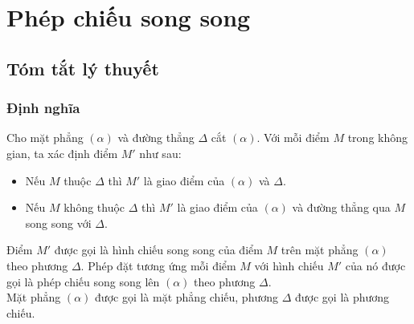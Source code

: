 \section{Phép chiếu song song}
\subsection{Tóm tắt lý thuyết}
\begin{tomtat}
\begin{center}
\end{center}
\subsubsection{Định nghĩa}
\begin{dn}
	Cho mặt phẳng $(\alpha)$ và đường thẳng $\Delta$ cắt $(\alpha)$. Với mỗi điểm $M$ trong không gian, ta xác định điểm $M'$ như sau:
\begin{itemize}
	\item Nếu $M$ thuộc $\Delta$ thì $M'$ là giao điểm của $(\alpha)$ và $\Delta$.
	\item Nếu $M$ không thuộc $\Delta$ thì $M'$ là giao điểm của $(\alpha)$ và đường thẳng qua $M$ song song với $\Delta$.
\end{itemize}
	Điểm $M'$ được gọi là hình chiếu song song của điểm $M$ trên mặt phẳng $(\alpha)$ theo phương $\Delta$. Phép đặt tương ứng mỗi điểm $M$ với hình chiếu $M'$ của nó được gọi là phép chiếu song song lên $(\alpha)$ theo phương $\Delta$.\\
	Mặt phẳng $(\alpha)$ được gọi là mặt phẳng chiếu, phương $\Delta$ được gọi là phương chiếu.
\end{dn}


\end{tomtat}
